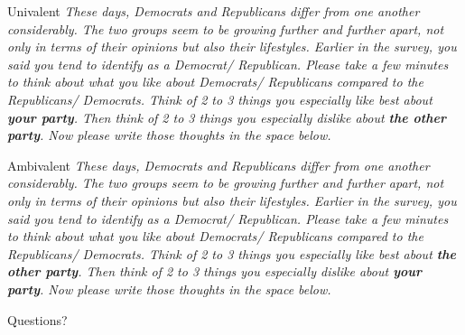 \documentclass[
  ignorenonframetext,
]{beamer}
\begin{document}
\begin{frame}{Univalent}
\protect\hypertarget{univalent-1}{}
\emph{These days, Democrats and Republicans differ from one another
considerably. The two groups seem to be growing further and further
apart, not only in terms of their opinions but also their lifestyles.
Earlier in the survey, you said you tend to identify as a Democrat/
Republican. Please take a few minutes to think about what you like about
Democrats/ Republicans compared to the Republicans/ Democrats. Think of
2 to 3 things you especially like best about \textbf{your party}. Then
think of 2 to 3 things you especially dislike about \textbf{the other
party}. Now please write those thoughts in the space below.}
\end{frame}

\begin{frame}{Ambivalent}
\protect\hypertarget{ambivalent-1}{}
\emph{These days, Democrats and Republicans differ from one another
considerably. The two groups seem to be growing further and further
apart, not only in terms of their opinions but also their lifestyles.
Earlier in the survey, you said you tend to identify as a Democrat/
Republican. Please take a few minutes to think about what you like about
Democrats/ Republicans compared to the Republicans/ Democrats. Think of
2 to 3 things you especially like best about \textbf{the other party}.
Then think of 2 to 3 things you especially dislike about \textbf{your
party}. Now please write those thoughts in the space below.}
\end{frame}

\begin{frame}{Questions?}
\protect\hypertarget{questions}{}
\end{frame}
\end{document}
